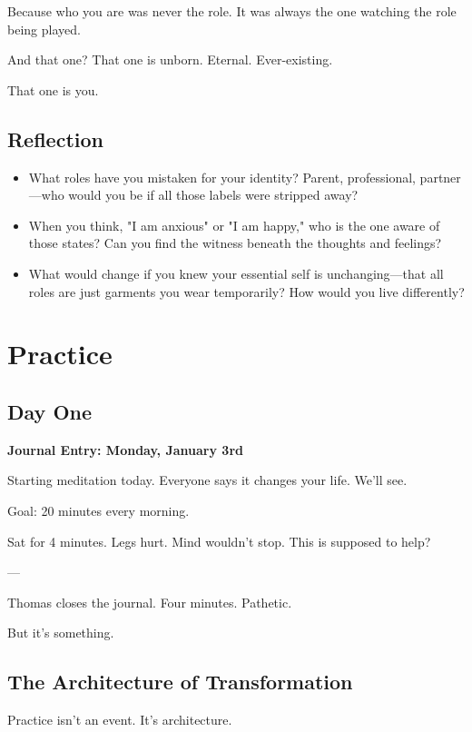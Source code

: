 \documentclass[11pt,twoside]{book}
\begin{document}
Because who you are was never the role. It was always the one watching the role being played.

And that one? That one is unborn. Eternal. Ever-existing.

That one is you.

\section*{Reflection}

\begin{itemize}
\item What roles have you mistaken for your identity? Parent, professional, partner—who would you be if all those labels were stripped away?
\item When you think, "I am anxious" or "I am happy," who is the one aware of those states? Can you find the witness beneath the thoughts and feelings?
\item What would change if you knew your essential self is unchanging—that all roles are just garments you wear temporarily? How would you live differently?
\end{itemize}

\chapter{Practice}

\section*{Day One}

\textbf{Journal Entry: Monday, January 3rd}

Starting meditation today. Everyone says it changes your life. We'll see.

Goal: 20 minutes every morning.

Sat for 4 minutes. Legs hurt. Mind wouldn't stop. This is supposed to help?

---

Thomas closes the journal. Four minutes. Pathetic.

But it's something.

\section*{The Architecture of Transformation}

Practice isn't an event. It's architecture.
\end{document}
